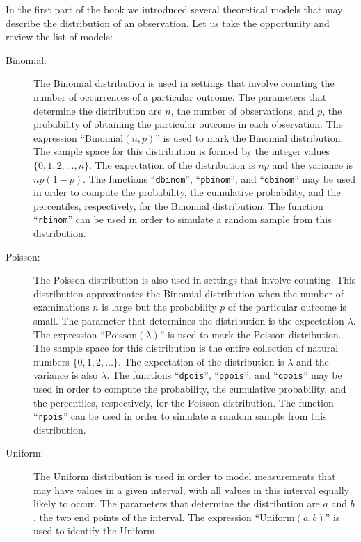 \documentclass[]{krantz}
\theoremstyle{definition}
\theoremstyle{definition}
\theoremstyle{definition}
\theoremstyle{remark}
\begin{document}
In the first part of the book we introduced several theoretical models
that may describe the distribution of an observation. Let us take the
opportunity and review the list of models:

\begin{description}
\item[Binomial:]
The Binomial distribution is used in settings that involve counting the
number of occurrences of a particular outcome. The parameters that
determine the distribution are \(n\), the number of observations, and
\(p\), the probability of obtaining the particular outcome in each
observation. The expression ``\(\mathrm{Binomial}(n,p)\)'' is used to
mark the Binomial distribution. The sample space for this distribution
is formed by the integer values \(\{0, 1, 2, \ldots, n\}\). The
expectation of the distribution is \(np\) and the variance is
\(np(1-p)\). The functions ``\texttt{dbinom}'', ``\texttt{pbinom}'', and
``\texttt{qbinom}'' may be used in order to compute the probability, the
cumulative probability, and the percentiles, respectively, for the
Binomial distribution. The function ``\texttt{rbinom}'' can be used in
order to simulate a random sample from this distribution.
\item[Poisson:]
The Poisson distribution is also used in settings that involve counting.
This distribution approximates the Binomial distribution when the number
of examinations \(n\) is large but the probability \(p\) of the
particular outcome is small. The parameter that determines the
distribution is the expectation \(\lambda\). The expression
``\(\mathrm{Poisson}(\lambda)\)'' is used to mark the Poisson
distribution. The sample space for this distribution is the entire
collection of natural numbers \(\{0, 1, 2, \ldots\}\). The expectation
of the distribution is \(\lambda\) and the variance is also \(\lambda\).
The functions ``\texttt{dpois}'', ``\texttt{ppois}'', and
``\texttt{qpois}'' may be used in order to compute the probability, the
cumulative probability, and the percentiles, respectively, for the
Poisson distribution. The function ``\texttt{rpois}'' can be used in
order to simulate a random sample from this distribution.
\item[Uniform:]
The Uniform distribution is used in order to model measurements that may
have values in a given interval, with all values in this interval
equally likely to occur. The parameters that determine the distribution
are \(a\) and \(b\), the two end points of the interval. The expression
``\(\mathrm{Uniform}(a,b)\)'' is used to identify the Uniform

\end{description}
\end{document}
